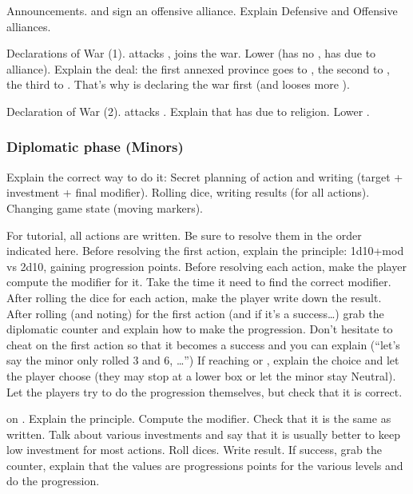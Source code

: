 \aparag Announcements.
\bparag \RUS and \POL sign an offensive alliance.
\bparag Explain Defensive and Offensive alliances.

\aparag Declarations of War (1).
\bparag \RUS attacks \paysDon, \POL joins the war.
\bparag Lower \STAB (\RUS has no \CB, \POL has due to alliance).
\bparag Explain the deal: the first annexed province goes to \RUS, the second
to \paysUkraine, the third to \RUS. That's why \RUS is declaring the war
first (and looses more \STAB).

\aparag Declaration of War (2).
\bparag \TUR attacks \paysGeorgie.
\bparag Explain that \TUR has \CB due to religion. Lower \STAB.

\subsubsection{Diplomatic phase (Minors)}
\aparag Explain the correct way to do it:
\bparag Secret planning of action and writing (target + investment + final
modifier).
\bparag Rolling dice, writing results (for all actions).
\bparag Changing game state (moving markers).

\aparag For tutorial, all actions are written. Be sure to resolve them in the
order indicated here.
\bparag Before resolving the first action, explain the principle: 1d10+mod vs
2d10, gaining progression points.
\bparag Before resolving each action, make the player compute the modifier for
it. Take the time it need to find the correct modifier.
\bparag After rolling the dice for each action, make the player write down the
result.
\bparag After rolling (and noting) for the first action (and if it's a
success\ldots) grab the diplomatic counter and explain how to make the
progression. Don't hesitate to cheat on the first action so that it becomes a
success and you can explain (``let's say the minor only rolled 3 and 6,
\ldots'')
\bparag If reaching \SUB or \RM, explain the choice and let the player
choose (they may stop at a lower box or let the minor stay Neutral).
\bparag Let the players try to do the progression themselves, but check that
it is correct.

\aparag \POL on \paysBrandebourg.
\bparag Explain the principle. Compute the modifier. Check that it is the same
as written.
\bparag Talk about various investments and say that it is usually better to
keep low investment for most actions.
\bparag Roll dices. Write result.
\bparag If success, grab the counter, explain that the values are progressions
points for the various levels and do the progression.

